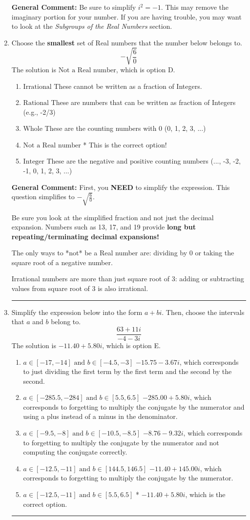 \documentclass{extbook}[14pt]
\newcommand{\litem}[1]{\item #1

\rule{\textwidth}{0.4pt}}
\begin{document}
\begin{enumerate}
{\textbf{General Comment:} Be sure to simplify $i^2 = -1$. This may remove the imaginary portion for your number. If you are having trouble, you may want to look at the \textit{Subgroups of the Real Numbers} section.
}
\litem{
Choose the \textbf{smallest} set of Real numbers that the number below belongs to.
\[ -\sqrt{\frac{6}{0}} \]
The solution is \( \text{Not a Real number} \), which is option D.\begin{enumerate}[label=\Alph*.]
\item \( \text{Irrational} \)
These cannot be written as a fraction of Integers.
\item \( \text{Rational} \)
These are numbers that can be written as fraction of Integers (e.g., -2/3)
\item \( \text{Whole} \)
These are the counting numbers with 0 (0, 1, 2, 3, ...)
\item \( \text{Not a Real number} \)
* This is the correct option!
\item \( \text{Integer} \)
These are the negative and positive counting numbers (..., -3, -2, -1, 0, 1, 2, 3, ...)
\end{enumerate}

\textbf{General Comment:} First, you \textbf{NEED} to simplify the expression. This question simplifies to $-\sqrt{\frac{6}{0}}$. 
 
 Be sure you look at the simplified fraction and not just the decimal expansion. Numbers such as 13, 17, and 19 provide \textbf{long but repeating/terminating decimal expansions!} 
 
 The only ways to *not* be a Real number are: dividing by 0 or taking the square root of a negative number. 
 
 Irrational numbers are more than just square root of 3: adding or subtracting values from square root of 3 is also irrational.
}
\litem{
Simplify the expression below into the form $a+bi$. Then, choose the intervals that $a$ and $b$ belong to.
\[ \frac{63 + 11 i}{-4 - 3 i} \]
The solution is \( -11.40  + 5.80 i \), which is option E.\begin{enumerate}[label=\Alph*.]
\item \( a \in [-17, -14] \text{ and } b \in [-4.5, -3] \)
 $-15.75  - 3.67 i$, which corresponds to just dividing the first term by the first term and the second by the second.
\item \( a \in [-285.5, -284] \text{ and } b \in [5.5, 6.5] \)
 $-285.00  + 5.80 i$, which corresponds to forgetting to multiply the conjugate by the numerator and using a plus instead of a minus in the denominator.
\item \( a \in [-9.5, -8] \text{ and } b \in [-10.5, -8.5] \)
 $-8.76  - 9.32 i$, which corresponds to forgetting to multiply the conjugate by the numerator and not computing the conjugate correctly.
\item \( a \in [-12.5, -11] \text{ and } b \in [144.5, 146.5] \)
 $-11.40  + 145.00 i$, which corresponds to forgetting to multiply the conjugate by the numerator.
\item \( a \in [-12.5, -11] \text{ and } b \in [5.5, 6.5] \)
* $-11.40  + 5.80 i$, which is the correct option.
\end{enumerate}

}
\end{enumerate}
\end{document}
